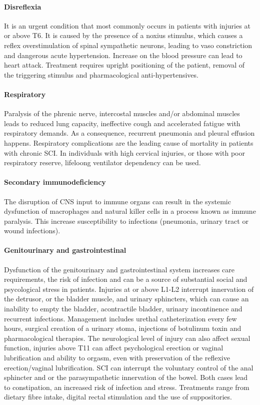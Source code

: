 \documentclass[12pt,article,oneside,a4paper]{memoir}
\begin{document}
\paragraph{Disreflexia}
It is an urgent condition that most commonly occurs in patients with injuries
at or above T6. It is caused by the presence of a noxius stimulus, which causes
a reflex overstimulation of spinal sympathetic neurons, leading to vaso
constriction and dangerous acute hypertension. Increase on the blood pressure
can lead to heart attack. Treatment requires upright positioning of the
patient, removal of the triggering stimulus and pharmacological
anti-hypertensives.

\paragraph{Respiratory}
Paralysis of the phrenic nerve, intercostal muscles and/or abdominal muscles
leads to reduced lung capacity, ineffective cough and accelerated fatigue with
respiratory demands. As a consequence, recurrent pneumonia and pleural effusion
happens. Respiratory complications are the leading cause of mortality in
patients with chronic SCI. In individuals with high cervical injuries, or those
with poor respiratory reserve, lifeloong ventilator dependency can be used.

\paragraph{Secondary immunodeficiency}
The disruption of CNS input to immune organs can result in the systemic
dysfunction of macrophages and natural killer cells in a process known as
immune paralysis. This increase susceptibility to infections (pneumonia,
urinary tract or wound infections).

\paragraph{Genitourinary and gastrointestinal}
Dysfunction of the genitourinary and gastrointestinal system increases care
requirements, the risk of infection and can be a source of substantial social
and psycological stress in patients. Injuries at or above L1-L2 interrupt
innervation of the detrusor, or the bladder muscle, and urinary sphincters,
which can cause an inability to empty the bladder, acontractile bladder,
urinary incontinence and recurrent infections. Management includes urethal
catheterization every few hours, surgical creation of a urinary stoma,
injections of botulinum toxin and pharmacological therapies. The neurological
level of injury can also affect sexual function, injuries above T11 can affect
psychological erection or vaginal lubrification and ability to orgasm, even
with preservation of the reflexive erection/vaginal lubrification. SCI can
interrupt the voluntary control of the anal sphincter and or the
parasympathetic innervation of the bowel. Both cases lead to constipation, an
increased risk of infection and stress. Treatments range from dietary fibre
intake, digital rectal stimulation and the use of suppositories.
\end{document}
